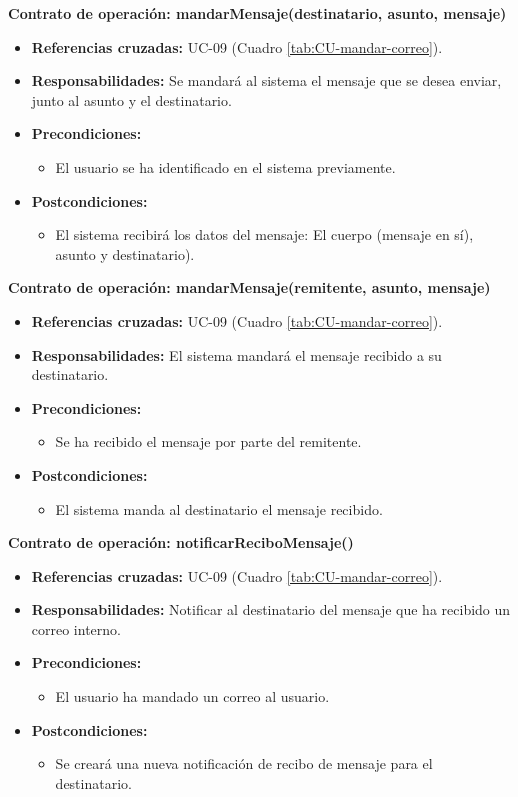 \textbf{Contrato de operación: mandarMensaje(destinatario, asunto, mensaje)}
\begin{itemize}
\item \textbf{Referencias cruzadas:} UC-09 (Cuadro \ref{tab:CU-mandar-correo}).
\item \textbf{Responsabilidades:} Se mandará al sistema el mensaje que se desea enviar, junto al asunto y el destinatario.
\item \textbf{Precondiciones:} 
 \begin{itemize}
\item El usuario se ha identificado en el sistema previamente.
\end {itemize}
\item \textbf{Postcondiciones:} 
 \begin{itemize}
\item El sistema recibirá los datos del mensaje: El cuerpo (mensaje en sí), asunto y destinatario).
\end {itemize}
\end {itemize}

\textbf{Contrato de operación: mandarMensaje(remitente, asunto, mensaje)}
\begin{itemize}
\item \textbf{Referencias cruzadas:} UC-09 (Cuadro \ref{tab:CU-mandar-correo}).
\item \textbf{Responsabilidades:} El sistema mandará el mensaje recibido a su destinatario.
\item \textbf{Precondiciones:} 
 \begin{itemize}
\item Se ha recibido el mensaje por parte del remitente.
\end {itemize}
\item \textbf{Postcondiciones:} 
 \begin{itemize}
\item El sistema manda al destinatario el mensaje recibido.
\end {itemize}
\end {itemize}

\textbf{Contrato de operación: notificarReciboMensaje()}
\begin{itemize}
\item \textbf{Referencias cruzadas:} UC-09 (Cuadro \ref{tab:CU-mandar-correo}).
\item \textbf{Responsabilidades:} Notificar al destinatario del mensaje que ha recibido un correo interno.
\item \textbf{Precondiciones:} 
 \begin{itemize}
\item El usuario ha mandado un correo al usuario.
\end {itemize}
\item \textbf{Postcondiciones:} 
 \begin{itemize}
\item Se creará una nueva notificación de recibo de mensaje para el destinatario.
\end {itemize}
\end {itemize}


